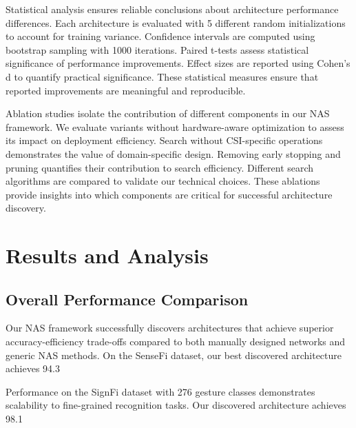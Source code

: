 \documentclass[journal]{IEEEtran}
\begin{document}
Statistical analysis ensures reliable conclusions about architecture performance differences. Each architecture is evaluated with 5 different random initializations to account for training variance. Confidence intervals are computed using bootstrap sampling with 1000 iterations. Paired t-tests assess statistical significance of performance improvements. Effect sizes are reported using Cohen's d to quantify practical significance. These statistical measures ensure that reported improvements are meaningful and reproducible.

Ablation studies isolate the contribution of different components in our NAS framework. We evaluate variants without hardware-aware optimization to assess its impact on deployment efficiency. Search without CSI-specific operations demonstrates the value of domain-specific design. Removing early stopping and pruning quantifies their contribution to search efficiency. Different search algorithms are compared to validate our technical choices. These ablations provide insights into which components are critical for successful architecture discovery.

\section{Results and Analysis}

\subsection{Overall Performance Comparison}

Our NAS framework successfully discovers architectures that achieve superior accuracy-efficiency trade-offs compared to both manually designed networks and generic NAS methods. On the SenseFi dataset, our best discovered architecture achieves 94.3%

Performance on the SignFi dataset with 276 gesture classes demonstrates scalability to fine-grained recognition tasks. Our discovered architecture achieves 98.1%
\end{document}
